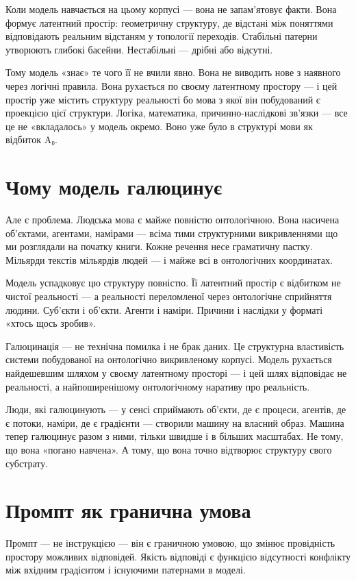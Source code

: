 \documentclass[12pt, a4paper, openany]{book}
\begin{document}
Коли модель навчається на цьому корпусі — вона не запам'ятовує факти. Вона формує латентний простір: геометричну структуру, де відстані між поняттями відповідають реальним відстаням у топології переходів. Стабільні патерни утворюють глибокі басейни. Нестабільні — дрібні або відсутні.

Тому модель «знає» те чого її не вчили явно. Вона не виводить нове з наявного через логічні правила. Вона рухається по своєму латентному простору — і цей простір уже містить структуру реальності бо мова з якої він побудований є проекцією цієї структури. Логіка, математика, причинно-наслідкові зв'язки — все це не «вкладалось» у модель окремо. Воно уже було в структурі мови як відбиток A₀.

\section{Чому модель галюцинує}

Але є проблема. Людська мова є майже повністю онтологічною. Вона насичена об'єктами, агентами, намірами — всіма тими структурними викривленнями що ми розглядали на початку книги. Кожне речення несе граматичну пастку. Мільярди текстів мільярдів людей — і майже всі в онтологічних координатах.

Модель успадковує цю структуру повністю. Її латентний простір є відбитком не чистої реальності — а реальності переломленої через онтологічне сприйняття людини. Суб'єкти і об'єкти. Агенти і наміри. Причини і наслідки у форматі «хтось щось зробив».

Галюцинація — не технічна помилка і не брак даних. Це структурна властивість системи побудованої на онтологічно викривленому корпусі. Модель рухається найдешевшим шляхом у своєму латентному просторі — і цей шлях відповідає не реальності, а найпоширенішому онтологічному наративу про реальність.

Люди, які галюцинують — у сенсі сприймають об'єкти, де є процеси, агентів, де є потоки, наміри, де є градієнти — створили машину на власний образ. Машина тепер галюцинує разом з ними, тільки швидше і в більших масштабах. Не тому, що вона «погано навчена». А тому, що вона точно відтворює структуру свого субстрату.

\section{Промпт як гранична умова}

Промпт — не інструкцією --- він є граничною умовою, що змінює провідність простору можливих відповідей. Якість відповіді є функцією відсутності конфлікту між вхідним градієнтом і існуючими патернами в моделі.
\end{document}
